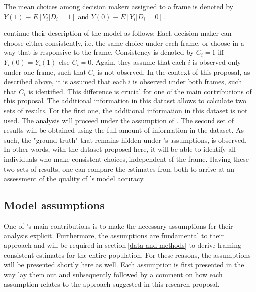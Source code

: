 The mean choices among decision makers assigned to a frame is denoted by 
$ \bar{Y}(1) \equiv E[Y_i | D_i = 1]  $ and $ \bar{Y}(0) \equiv E[Y_i | D_i = 0]  $.

\textcite{goldin2020} continue their description of the model as follows: Each
decision maker can choose either consistently, i.e. the same choice under each frame,
or choose in a way that is responsive to the frame. Consistency is denoted by $ C_i = 1 $ iff $Y_i(0) = Y_i(1) $ else $C_i = 0 $.
Again, they assume that each $ i $ is observed only under one frame, such that $C_i$ is not observed.
In the context of this proposal, as described above, it is assumed that each $ i $ is observed under both frames, such that
$ C_i $ is identified. This difference is crucial for one of the main contributions of this proposal.
The additional information in this dataset allows to calculate two sets of results. For the first one, the additional information in this dataset is not used.
The analysis will proceed under the assumption of \textcite{goldin2020}. The second set of results will be obtained using the full amount of information
in the dataset. As such, the "ground-truth" that remains hidden under \textcite{goldin2020}'s assumptions, is observed. In other words, with the dataset proposed 
here, it will be able to identify all individuals who make consistent choices, independent of the frame. 
Having these two sets of results, one can compare the estimates from both to arrive at an assessment of the quality of \textcite{goldin2020}'s model accuracy.


\subsection{Model assumptions}\label{ass}

One of \textcite{goldin2020}'s main contributions is to make the necessary assumptions for their analysis explicit.
Furthermore, the assumptions are fundamental to their approach and will be required in section \ref{data and methods} to
derive framing-consistent estimates for the entire population.
For these reasons, the assumptions will be presented shortly here as well.
Each assumption is first presented in the way \textcite{goldin2020} lay them out and subsequently
followed by a comment on how each assumption relates to the approach suggested in this research proposal.

